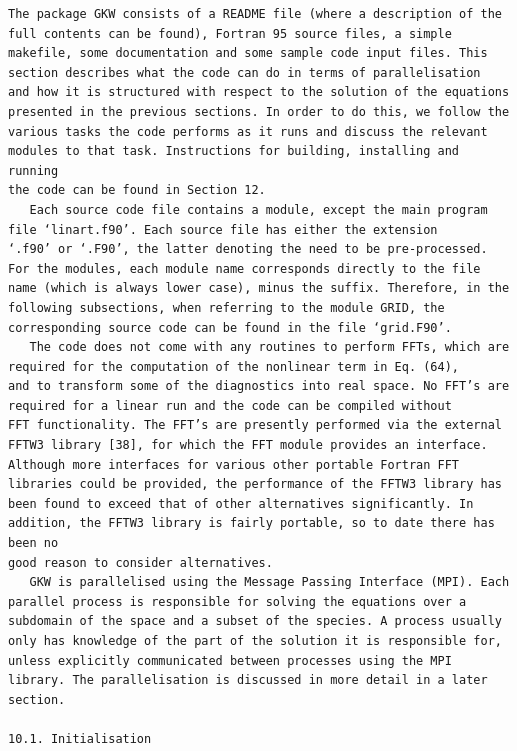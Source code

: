 \documentclass[a4paper]{article}
\newcommand{\gkwpagefont}{\fontsize{6.0pt}{7.55pt}\selectfont}
\begin{document}
\begin{Verbatim}[fontsize=\gkwpagefont]
   The package GKW consists of a README file (where a description of the full contents can be found), Fortran 95 source files, a simple
makefile, some documentation and some sample code input files. This section describes what the code can do in terms of parallelisation
and how it is structured with respect to the solution of the equations presented in the previous sections. In order to do this, we follow the
various tasks the code performs as it runs and discuss the relevant modules to that task. Instructions for building, installing and running
the code can be found in Section 12.
   Each source code file contains a module, except the main program file ‘linart.f90’. Each source file has either the extension
‘.f90’ or ‘.F90’, the latter denoting the need to be pre-processed. For the modules, each module name corresponds directly to the file
name (which is always lower case), minus the suffix. Therefore, in the following subsections, when referring to the module GRID, the
corresponding source code can be found in the file ‘grid.F90’.
   The code does not come with any routines to perform FFTs, which are required for the computation of the nonlinear term in Eq. (64),
and to transform some of the diagnostics into real space. No FFT’s are required for a linear run and the code can be compiled without
FFT functionality. The FFT’s are presently performed via the external FFTW3 library [38], for which the FFT module provides an interface.
Although more interfaces for various other portable Fortran FFT libraries could be provided, the performance of the FFTW3 library has
been found to exceed that of other alternatives significantly. In addition, the FFTW3 library is fairly portable, so to date there has been no
good reason to consider alternatives.
   GKW is parallelised using the Message Passing Interface (MPI). Each parallel process is responsible for solving the equations over a
subdomain of the space and a subset of the species. A process usually only has knowledge of the part of the solution it is responsible for,
unless explicitly communicated between processes using the MPI library. The parallelisation is discussed in more detail in a later section.

10.1. Initialisation


\end{Verbatim}
\end{document}

